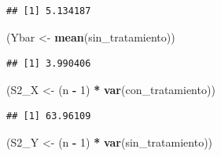 \documentclass[
  12pt,
]{book}
\newenvironment{Shaded}{\begin{snugshade}}{\end{snugshade}}
\newcommand{\CharTok}[1]{\textcolor[rgb]{0.31,0.60,0.02}{#1}}
\newcommand{\DataTypeTok}[1]{\textcolor[rgb]{0.13,0.29,0.53}{#1}}
\newcommand{\DecValTok}[1]{\textcolor[rgb]{0.00,0.00,0.81}{#1}}
\newcommand{\KeywordTok}[1]{\textcolor[rgb]{0.13,0.29,0.53}{\textbf{#1}}}
\newcommand{\NormalTok}[1]{#1}
\newcommand{\OperatorTok}[1]{\textcolor[rgb]{0.81,0.36,0.00}{\textbf{#1}}}
\newcommand{\OtherTok}[1]{\textcolor[rgb]{0.56,0.35,0.01}{#1}}
\newcommand{\StringTok}[1]{\textcolor[rgb]{0.31,0.60,0.02}{#1}}
\begin{document}
\begin{Shaded}
\end{Shaded}

\begin{verbatim}
## [1] 5.134187
\end{verbatim}

\begin{Shaded}
\begin{Highlighting}[]
\NormalTok{(Ybar \textless{}{-}}\StringTok{ }\KeywordTok{mean}\NormalTok{(sin\_tratamiento))}
\end{Highlighting}
\end{Shaded}

\begin{verbatim}
## [1] 3.990406
\end{verbatim}

\begin{Shaded}
\begin{Highlighting}[]
\NormalTok{(S2\_X \textless{}{-}}\StringTok{ }\NormalTok{(n }\OperatorTok{{-}}\StringTok{ }\DecValTok{1}\NormalTok{) }\OperatorTok{*}\StringTok{ }\KeywordTok{var}\NormalTok{(con\_tratamiento))}
\end{Highlighting}
\end{Shaded}

\begin{verbatim}
## [1] 63.96109
\end{verbatim}

\begin{Shaded}
\begin{Highlighting}[]
\NormalTok{(S2\_Y \textless{}{-}}\StringTok{ }\NormalTok{(n }\OperatorTok{{-}}\StringTok{ }\DecValTok{1}\NormalTok{) }\OperatorTok{*}\StringTok{ }\KeywordTok{var}\NormalTok{(sin\_tratamiento))}
\end{Highlighting}
\end{Shaded}
\end{document}
